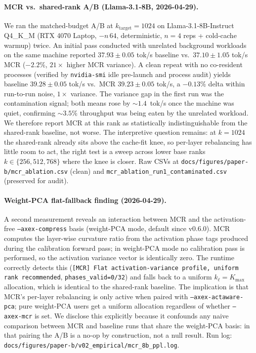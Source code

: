\documentclass[11pt]{article}
\begin{document}
\paragraph{MCR vs.\ shared-rank A/B (Llama-3.1-8B, 2026-04-29).}
We ran the matched-budget A/B at $k_\text{target}{=}1024$ on
Llama-3.1-8B-Instruct Q4\_K\_M (RTX 4070 Laptop, $-n\,64$, deterministic,
$n{=}4$ reps + cold-cache warmup) twice. An initial pass conducted with
unrelated background workloads on the same machine reported
$37.93\pm 0.05$ tok/s baseline vs.\ $37.10\pm 1.05$ tok/s MCR
($-2.2\%$, $21\times$ higher MCR variance). A clean repeat with no
co-resident processes (verified by \texttt{nvidia-smi} idle pre-launch
and process audit) yields baseline $39.28\pm 0.05$ tok/s vs.\ MCR
$39.23\pm 0.05$ tok/s, a $-0.13\%$ delta within run-to-run
noise, $1{\times}$ variance. The variance gap in the first run was
the contamination signal; both means rose by $\sim 1.4$~tok/s once the
machine was quiet, confirming $\sim 3.5\%$ throughput was being eaten
by the unrelated workload. We therefore report MCR at this rank as
statistically indistinguishable from the shared-rank baseline,
not worse. The interpretive question remains: at $k{=}1024$ the
shared-rank already sits above the cache-fit knee, so per-layer
rebalancing has little room to act, the right test is a sweep across
lower base ranks $k{\in}\{256, 512, 768\}$ where the knee is closer.
Raw CSVs at \texttt{docs/figures/paper-b/mcr\_ablation.csv} (clean) and
\texttt{mcr\_ablation\_run1\_contaminated.csv} (preserved for audit).

\paragraph{Weight-PCA flat-fallback finding (2026-04-29).}
A second measurement reveals an interaction between MCR and the
activation-free \texttt{--axex-compress} basis (weight-PCA mode, default
since v0.6.0). MCR computes the layer-wise curvature ratio from the
activation phase tags produced during the calibration forward pass; in
weight-PCA mode no calibration pass is performed, so the activation
variance vector is identically zero. The runtime correctly detects this
(\texttt{[MCR] Flat activation-variance profile, uniform rank
recommended}, \texttt{phases\_valid=0/32}) and falls back to a uniform
$k_\ell{=}K_\text{max}$ allocation, which is identical to the
shared-rank baseline. The implication is that MCR's per-layer
rebalancing is only active when paired with
\texttt{--axex-actaware-pca}; pure weight-PCA users get a uniform
allocation regardless of whether \texttt{--axex-mcr} is set. We disclose
this explicitly because it confounds any naive comparison between MCR
and baseline runs that share the weight-PCA basis: in that pairing the
A/B is a no-op by construction, not a null result. Run log:
\texttt{docs/figures/paper-b/v02\_empirical/mcr\_8b\_ppl.log}.
\end{document}
